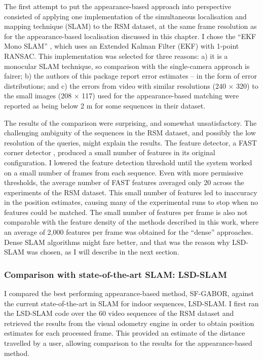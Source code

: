 The first attempt to put the appearance-based approach into perspective consisted of applying one implementation of the simultaneous localisation and mapping technique (SLAM) to the RSM dataset, at the same frame resolution as for the appearance-based  localisation discussed in this chapter. I chose the ``EKF Mono SLAM'' \citep{civera20091}, which uses an Extended Kalman Filter (EKF) with 1-point RANSAC.  This implementation was selected for three reasons: a) it is a monocular SLAM technique, so comparison with the single-camera approach is fairer; b) the authors of this package report error estimates -- in the form of error distributions; and c) the errors from video with similar resolutions (240 $\times$ 320) to the small images (208 $\times$ 117) used for the appearance-based matching were reported as being below 2 m for some sequences \citep{civera20091} in their dataset.

The results of the comparison were surprising, and somewhat unsatisfactory. The challenging ambiguity of the sequences in the RSM dataset, and possibly the low resolution of the queries, might explain the results. The feature detector, a FAST corner detector \citep{rosten2006machine}, produced a small number of features in its original  configuration. I lowered the feature detection threshold until the system worked on a small number of frames from each sequence. Even with more permissive thresholds, the average number of FAST features averaged only 20 across the experiments of the RSM dataset. This small number of features led to inaccuracy in the position estimates, causing many of the experimental runs to stop when no features could be matched. The small number of features per frame is also not comparable with the feature density of the methods described in this work, where an average of 2,000 features per frame was obtained for the ``dense'' approaches. Dense SLAM algorithms might fare better, and that was the reason why LSD-SLAM was chosen, as I will describe in the next section.

\subsubsection{Comparison with state-of-the-art SLAM: LSD-SLAM}
\label{sec:comparisonSLAM}

I compared the best performing appearance-based method, SF-GABOR, against the current state-of-the-art in SLAM for indoor sequences, LSD-SLAM.  I first ran the LSD-SLAM code over the 60 video sequences of the RSM dataset and retrieved the results from the visual odometry engine in order to obtain position estimates for each processed frame.  This provided an estimate of the distance travelled by a user, allowing comparison to the results for the appearance-based method. 


